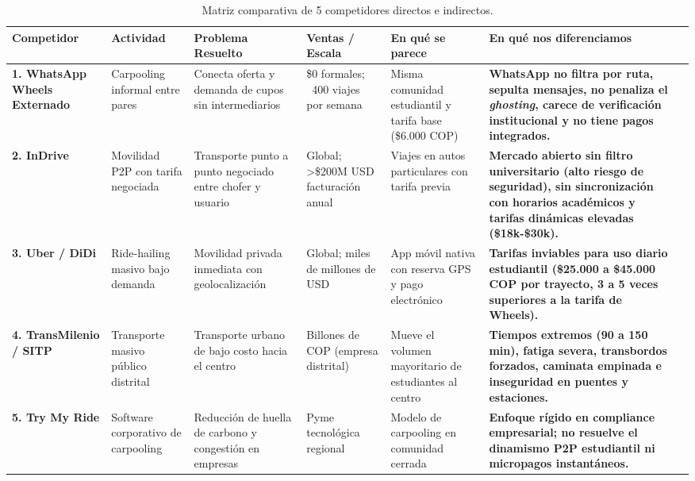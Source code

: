 \documentclass[11pt,a4paper]{article}
\begin{document}
\begin{table}[h!]
\centering
\scriptsize
\begin{tabularx}{\textwidth}{p{2.3cm} p{1.8cm} p{2.2cm} p{1.5cm} p{1.8cm} p{1.8cm} X}
\toprule
\textbf{Competidor} & \textbf{Actividad} & \textbf{Problema Resuelto} & \textbf{Ventas / Escala} & \textbf{En qué se parece} & \textbf{En qué nos diferenciamos} \\
\midrule
\textbf{1. WhatsApp Wheels Externado} & Carpooling informal entre pares & Conecta oferta y demanda de cupos sin intermediarios & \$0 formales; ~400 viajes por semana & Misma comunidad estudiantil y tarifa base (\$6.000 COP) & \textbf{WhatsApp no filtra por ruta, sepulta mensajes, no penaliza el \textit{ghosting}, carece de verificación institucional y no tiene pagos integrados.} \\
\midrule
\textbf{2. InDrive} & Movilidad P2P con tarifa negociada & Transporte punto a punto negociado entre chofer y usuario & Global; >\$200M USD facturación anual & Viajes en autos particulares con tarifa previa & \textbf{Mercado abierto sin filtro universitario (alto riesgo de seguridad), sin sincronización con horarios académicos y tarifas dinámicas elevadas (\$18k-\$30k).} \\
\midrule
\textbf{3. Uber / DiDi} & Ride-hailing masivo bajo demanda & Movilidad privada inmediata con geolocalización & Global; miles de millones de USD & App móvil nativa con reserva GPS y pago electrónico & \textbf{Tarifas inviables para uso diario estudiantil (\$25.000 a \$45.000 COP por trayecto, 3 a 5 veces superiores a la tarifa de Wheels).} \\
\midrule
\textbf{4. TransMilenio / SITP} & Transporte masivo público distrital & Transporte urbano de bajo costo hacia el centro & Billones de COP (empresa distrital) & Mueve el volumen mayoritario de estudiantes al centro & \textbf{Tiempos extremos (90 a 150 min), fatiga severa, transbordos forzados, caminata empinada e inseguridad en puentes y estaciones.} \\
\midrule
\textbf{5. Try My Ride} & Software corporativo de carpooling & Reducción de huella de carbono y congestión en empresas & Pyme tecnológica regional & Modelo de carpooling en comunidad cerrada & \textbf{Enfoque rígido en compliance empresarial; no resuelve el dinamismo P2P estudiantil ni micropagos instantáneos.} \\
\bottomrule
\end{tabularx}
\caption{Matriz comparativa de 5 competidores directos e indirectos.}
\end{table}
\end{document}
